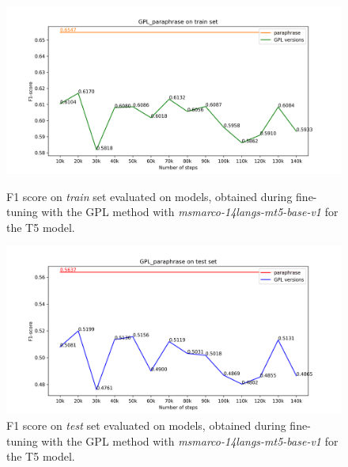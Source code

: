 \documentclass[fleqn,moreauthors,10pt]{ds_report}
\begin{document}
\begin{figure}
    \centering
    \begin{minipage}{0.5\textwidth}
        \centering
        \includegraphics[width=\linewidth]{GPL__paraphrase_train.png}
        \caption{F1 score on \textit{train} set evaluated on models, obtained during fine-tuning with the GPL method with {\it msmarco-14langs-mt5-base-v1} \cite{msmarco14langs} for the T5 model.}
		\label{fig:gpl-versions-train}
    \end{minipage}\hfill
    \begin{minipage}{0.5\textwidth}
        \centering
        \includegraphics[width=\linewidth]{GPL__paraphrase_test.png}
        \caption{F1 score on \textit{test} set evaluated on models, obtained during fine-tuning with the GPL method with {\it msmarco-14langs-mt5-base-v1} \cite{msmarco14langs} for the T5 model.}
		\label{fig:gpl-versions}
    \end{minipage}
\end{figure}
\end{document}
